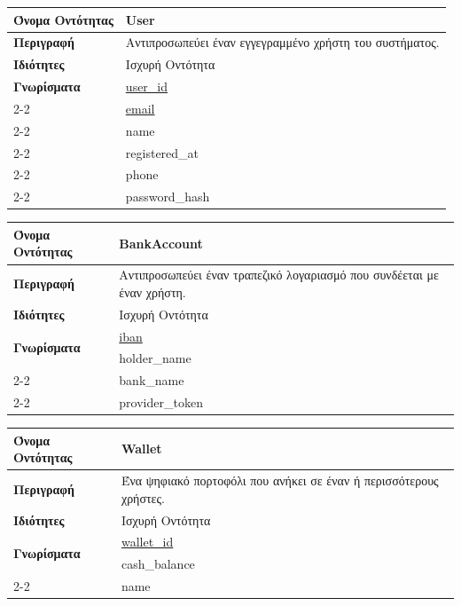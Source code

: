 \noindent
\begin{tabular}{|p{4cm}|p{10cm}|}
\hline
\textbf{Όνομα Οντότητας} & User \\ \hline
\textbf{Περιγραφή} & Αντιπροσωπεύει έναν εγγεγραμμένο χρήστη του συστήματος. \\ \hline
\textbf{Ιδιότητες} & Ισχυρή Οντότητα \\ \hline
\textbf{Γνωρίσματα} &
\underline{user\_id}\\
\cline{2-2}
& \underline{email}\\
\cline{2-2}
& name\\
\cline{2-2}
& registered\_at\\
\cline{2-2}
& phone\\
\cline{2-2}
& password\_hash\\
\hline
\end{tabular}

\vspace{1cm}

\noindent
\begin{tabular}{|p{4cm}|p{10cm}|}
\hline
\textbf{Όνομα Οντότητας} & BankAccount \\ \hline
\textbf{Περιγραφή} & Αντιπροσωπεύει έναν τραπεζικό λογαριασμό που συνδέεται με έναν χρήστη. \\ \hline
\textbf{Ιδιότητες} & Ισχυρή Οντότητα \\ \hline
\multirow{2}{4cm}{\textbf{Γνωρίσματα}} &
\underline{iban} \\
\cline{2-2}
& holder\_name \\
\cline{2-2}
& bank\_name \\
\cline{2-2}
& provider\_token \\
\hline
\end{tabular}

\vspace{1cm}

\noindent
\begin{tabular}{|p{4cm}|p{10cm}|}
\hline
\textbf{Όνομα Οντότητας} & Wallet \\ \hline
\textbf{Περιγραφή} & Ένα ψηφιακό πορτοφόλι που ανήκει σε έναν ή περισσότερους χρήστες. \\ \hline
\textbf{Ιδιότητες} & Ισχυρή Οντότητα \\ \hline
\multirow{2}{4cm}{\textbf{Γνωρίσματα}} &
\underline{wallet\_id} \\
\cline{2-2}
& cash\_balance \\
\cline{2-2}
& name \\
\hline
\end{tabular}

